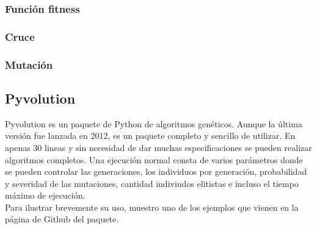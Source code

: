 \documentclass[12pt,a4paper]{article}
\begin{document}
			\subsubsection{Funci\'on fitness}
			\subsubsection{Cruce}
			\subsubsection{Mutaci\'on}
		\subsection{Pyvolution}
		
		Pyvolution es un paquete de Python de algoritmos gen\'eticos. Aunque la \'ultima versi\'on fue lanzada en 2012, es un paquete completo y sencillo de utilizar. En apenas 30 lineas y sin necesidad de dar muchas especificaciones se pueden realizar algoritmos completos. Una ejecuci\'on normal consta de varios par\'ametros donde se pueden controlar las generaciones, los individuos por generaci\'on, probabilidad y severidad de las mutaciones, cantidad indiviudos elitistas e incluso el tiempo m\'aximo de ejecuci\'on.\\
		
		Para ilustrar brevemente su uso, muestro uno de los ejemplos que vienen en la p\'agina de Github del paquete.
		
\end{document}
